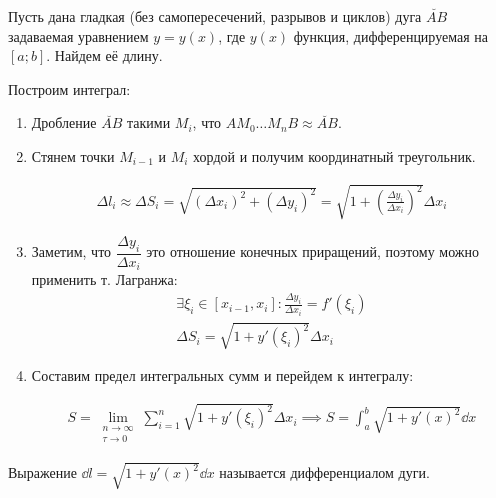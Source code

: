 
Пусть дана гладкая (без самопересечений, разрывов и циклов) дуга \(\breve{AB}\)
задаваемая уравнением \(y = y(x)\), где \(y(x)\) функция, дифференцируемая на
\([a; b]\). Найдем её длину.

Построим интеграл:
\begin{enumerate}
  \item Дробление \(\breve{AB}\) такими \(M_{i}\), что
  \(A M_{0} \dotsc M_{n} B \approx \breve{AB}\).

  \item Стянем точки \(M_{i - 1}\) и \(M_{i}\) хордой и получим координатный
  треугольник.

  \begin{multicols}{2}
    \begin{align*}
      \Delta l_{i}
      \approx \Delta S_{i}
      = \sqrt{(\Delta x_{i})^2 + (\Delta y_{i})^2}
      = \sqrt{1 + \left(\frac{\Delta y_{i}}{\Delta x_{i}}\right)^2} \Delta x_{i}
    \end{align*}
    \columnbreak

  \end{multicols}

  \item Заметим, что \(\dfrac{\Delta y_{i}}{\Delta x_{i}}\) это отношение
  конечных приращений, поэтому можно применить т. Лагранжа:
  \begin{align*}
    \exists \xi_{i} \in [x_{i - 1}, x_{i}] \colon
      \frac{\Delta y_{i}}{\Delta x_{i}} = f'(\xi_{i})
    \\
    \Delta S_{i}
    = \sqrt{1 + y'(\xi_{i})^2} \Delta x_{i}
  \end{align*}
  
  \item Составим предел интегральных сумм и перейдем к интегралу:

  \begin{align*}
    S = \lim_{\substack{n \to \infty \\ \tau \to 0}}
      \sum_{i = 1}^{n} \sqrt{1 + y'(\xi_{i})^2} \Delta x_{i}
    \implies S = \int_{a}^{b} \sqrt{1 + y'(x)^2} \dd x
  \end{align*}
\end{enumerate}

\begin{remark}
  Выражение \(\dd l = \sqrt{1 + y'(x)^2} \dd x\) называется дифференциалом дуги.
\end{remark}